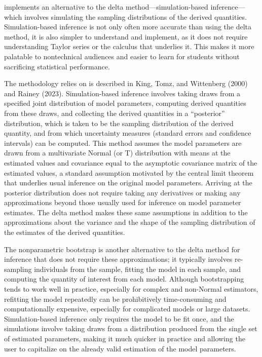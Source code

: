  implements an alternative to the delta method---simulation-based inference---which involves simulating the sampling distributions of the derived quantities. Simulation-based inference is not only often more accurate than using the delta method, it is also simpler to understand and implement, as it does not require understanding Taylor series or the calculus that underlies it. This makes it more palatable to nontechnical audiences and easier to learn for students without sacrificing statistical performance.

The methodology  relies on is described in King, Tomz, and Wittenberg (2000) and Rainey (2023). Simulation-based inference involves taking draws from a specified joint distribution of model parameters, computing derived quantities from these draws, and collecting the derived quantities in a ``posterior'' distribution, which is taken to be the sampling distribution of the derived quantity, and from which uncertainty measures (standard errors and confidence intervals) can be computed. This method assumes the model parameters are drawn from a multivariate Normal (or T) distribution with means at the estimated values and covariance equal to the asymptotic covariance matrix of the estimated values, a standard assumption motivated by the central limit theorem that underlies usual inference on the original model parameters. Arriving at the posterior distribution does not require taking any derivatives or making any approximations beyond those usually used for inference on model parameter estimates. The delta method makes these same assumptions in addition to the approximations about the variance and the shape of the sampling distribution of the estimates of the derived quantities.

The nonparametric bootstrap is another alternative to the delta method for inference that does not require these approximations; it typically involves re-sampling individuals from the sample, fitting the model in each sample, and computing the quantity of interest from each model. Although bootstrapping tends to work well in practice, especially for complex and non-Normal estimators, refitting the model repeatedly can be prohibitively time-consuming and computationally expensive, especially for complicated models or large datasets. Simulation-based inference only requires the model to be fit once, and the simulations involve taking draws from a distribution produced from the single set of estimated parameters, making it much quicker in practice and allowing the user to capitalize on the already valid estimation of the model parameters.

